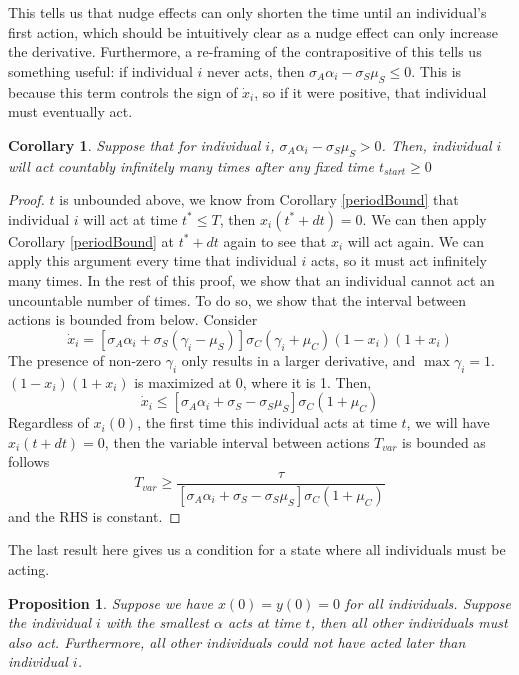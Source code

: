 \documentclass[preprint,12pt]{elsarticle}
\newtheorem{prop}{Proposition}
\newtheorem{cor}{Corollary}
\begin{document}
This tells us that nudge effects can only shorten the time until an individual's first action, which should be intuitively clear as a nudge effect can only increase the derivative. Furthermore, a re-framing of the contrapositive of this tells us something useful: if individual $i$ never acts, then $\sigma_A\alpha_i - \sigma_S\mu_S \leq 0$. This is because this term controls the sign of $\dot x_i$, so if it were positive, that individual must eventually act.

\begin{cor}\label{Cor:countablyInfinite}
{Suppose that for individual $i$, $\sigma_A\alpha_i - \sigma_S\mu_S > 0$. Then, individual $i$ will act countably infinitely many times after any fixed time $t_{start} \geq 0$}
\end{cor}
\begin{proof} $t$ is unbounded above, we know from Corollary \ref{periodBound} that individual $i$ will act at time $t^* \leq T$, then $x_i(t^* + dt)  =0$. We can then apply Corollary \ref{periodBound} at $t^* + dt$ again to see that $x_i$ will act again. We can apply this argument every time that individual $i$ acts, so it must act infinitely many times. In the rest of this proof, we show that an individual cannot act an uncountable number of times. To do so, we show that the interval between actions is bounded from below. Consider
\[
\dot x_i = [\sigma_A \alpha_i + \sigma_S(\gamma_i - \mu_S)]\sigma_C (\gamma_i + \mu_C)(1-x_i)(1+x_i)
\]
The presence of non-zero $\gamma_i$ only results in a larger derivative, and $\max \gamma_i = 1$. $(1-x_i)(1+x_i)$ is maximized at 0, where it is 1. Then, \[
\dot x_i \leq [\sigma_A \alpha_i + \sigma_S - \sigma_S\mu_S]\sigma_C (1 + \mu_C)
\]
Regardless of $x_i(0)$, the first time this individual acts at time $t$, we will have $x_i(t + dt) = 0$, then the variable interval between actions $T_{var}$ is bounded as follows \[
T_{var} \geq \frac{\tau}{[\sigma_A \alpha_i + \sigma_S - \sigma_S\mu_S]\sigma_C (1 + \mu_C)}
\]
and the RHS is constant. \end{proof}

The last result here gives us a condition for a state where all individuals must be acting.

\begin{prop}\label{smallestAlpha}
  Suppose we have $x(0) = y(0) = 0$ for all individuals. Suppose the individual $i$ with the smallest $\alpha$ acts at time $t$, then all other individuals must also act. Furthermore, all other individuals could not have acted later than individual $i$.
\end{prop}
\end{document}
